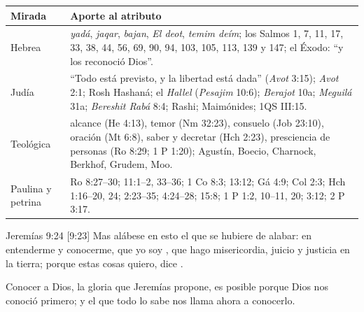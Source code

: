 \begin{center}\small\renewcommand{\arraystretch}{1.3}
\begin{tabular}{@{}L{3.0cm}L{11.4cm}@{}}
\toprule
\textbf{Mirada} & \textbf{Aporte al atributo} \\ \midrule
Hebrea & \emph{yadá}, \emph{jaqar}, \emph{bajan}, \emph{El deot}, \emph{temim deím}; los Salmos 1, 7, 11, 17, 33, 38, 44, 56, 69, 90, 94, 103, 105, 113, 139 y 147; el Éxodo: ``y los reconoció Dios''. \\
Judía & ``Todo está previsto, y la libertad está dada'' (\emph{Avot} 3:15); \emph{Avot} 2:1; Rosh Hashaná; el \emph{Hallel} (\emph{Pesajim} 10:6); \emph{Berajot} 10a; \emph{Meguilá} 31a; \emph{Bereshit Rabá} 8:4; Rashi; Maimónides; 1QS III:15. \\
Teológica & alcance (He 4:13), temor (Nm 32:23), consuelo (Job 23:10), oración (Mt 6:8), saber y decretar (Hch 2:23), presciencia de personas (Ro 8:29; 1 P 1:20); Agustín, Boecio, Charnock, Berkhof, Grudem, Moo. \\
Paulina y petrina & Ro 8:27--30; 11:1--2, 33--36; 1 Co 8:3; 13:12; Gá 4:9; Col 2:3; Hch 1:16--20, 24; 2:23--35; 4:24--28; 15:8; 1 P 1:2, 10--11, 20; 3:12; 2 P 3:17. \\
\bottomrule
\end{tabular}\end{center}

\begin{verso}{Jeremías 9:24 [9:23]}
Mas alábese en esto el que se hubiere de alabar: en entenderme y conocerme, que yo soy \SENOR{}, que hago misericordia, juicio y justicia en la tierra; porque estas cosas quiero, dice \SENOR{}.
\end{verso}

Conocer a Dios, la gloria que Jeremías propone, es posible porque Dios nos conoció primero; y el que todo lo sabe nos llama ahora a conocerlo.

